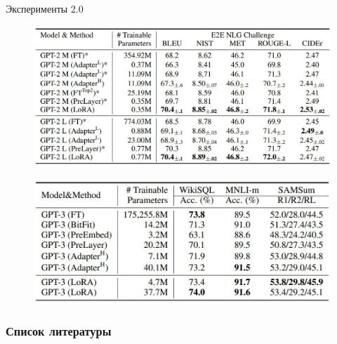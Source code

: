 \documentclass[9pt]{beamer}
\begin{document}
\begin{frame}{Эксперименты 2.0}
    
    
    \begin{figure}
        \begin{center}
            \includegraphics[scale=0.3]{images/lora_4.jpg}
        \end{center}
    \end{figure}

    \begin{figure}
        \begin{center}
            \includegraphics[scale=0.3]{images/lora_5.jpg}
        \end{center}
    \end{figure}

\end{frame}


\begin{frame}[allowframebreaks]
    \frametitle{Список литературы}
    \printbibliography
\end{frame}
\end{document}

